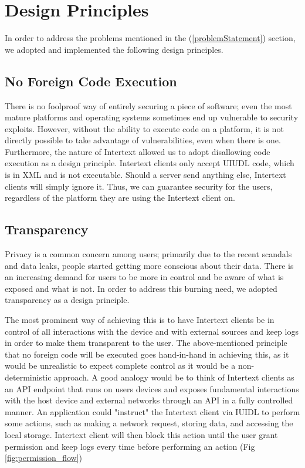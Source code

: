
\section{Design Principles} \label{designPrinciples}

In order to address the problems mentioned in the  (\ref{problemStatement}) section, we adopted and implemented the following design principles.

\subsection{No Foreign Code Execution}

There is no foolproof way of entirely securing a piece of software; even the most mature platforms and operating systems sometimes end up vulnerable to security exploits. However, without the ability to execute code on a platform, it is not directly possible to take advantage of vulnerabilities, even when there is one. Furthermore, the nature of Intertext allowed us to adopt disallowing code execution as a design principle. Intertext clients only accept UIUDL code, which is in XML and is not executable. Should a server send anything else, Intertext clients will simply ignore it. Thus, we can guarantee security for the users, regardless of the platform they are using the Intertext client on.

\subsection{Transparency}

Privacy is a common concern among users; primarily due to the recent scandals and data leaks, people started getting more conscious about their data. There is an increasing demand for users to be more in control and be aware of what is exposed and what is not. In order to address this burning need, we adopted transparency as a design principle. 

The most prominent way of achieving this is to have Intertext clients be in control of all interactions with the device and with external sources and keep logs in order to make them transparent to the user. The above-mentioned principle that no foreign code will be executed goes hand-in-hand in achieving this, as it would be unrealistic to expect complete control as it would be a non-deterministic approach. A good analogy would be to think of Intertext clients as an API endpoint that runs on users devices and exposes fundamental interactions with the host device and external networks through an API in a fully controlled manner. An application could "instruct" the Intertext client via IUIDL to perform some actions, such as making a network request, storing data, and accessing the local storage. Intertext client will then block this action until the user grant permission and keep logs every time before performing an action (Fig \ref{fig:permission_flow})

